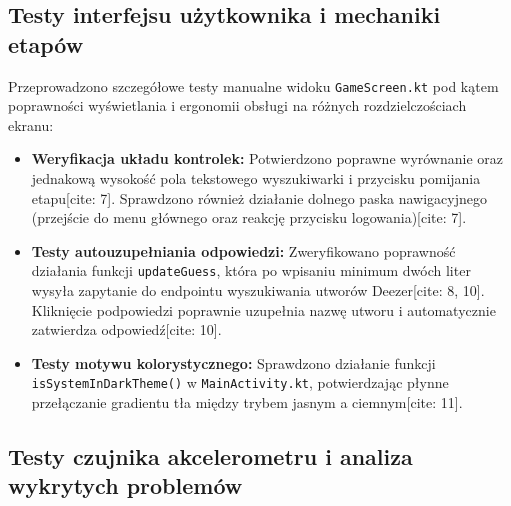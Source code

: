 \subsection{Testy interfejsu użytkownika i mechaniki etapów}

\hspace{0.60cm}Przeprowadzono szczegółowe testy manualne widoku \texttt{GameScreen.kt} pod kątem poprawności wyświetlania i ergonomii obsługi na różnych rozdzielczościach ekranu:
\begin{itemize}
    \item \textbf{Weryfikacja układu kontrolek:} Potwierdzono poprawne wyrównanie oraz jednakową wysokość pola tekstowego wyszukiwarki i przycisku pomijania etapu[cite: 7]. Sprawdzono również działanie dolnego paska nawigacyjnego (przejście do menu głównego oraz reakcję przycisku logowania)[cite: 7].
    \item \textbf{Testy autouzupełniania odpowiedzi:} Zweryfikowano poprawność działania funkcji \texttt{updateGuess}, która po wpisaniu minimum dwóch liter wysyła zapytanie do endpointu wyszukiwania utworów Deezer[cite: 8, 10]. Kliknięcie podpowiedzi poprawnie uzupełnia nazwę utworu i automatycznie zatwierdza odpowiedź[cite: 10].
    \item \textbf{Testy motywu kolorystycznego:} Sprawdzono działanie funkcji \texttt{isSystemInDarkTheme()} w \texttt{MainActivity.kt}, potwierdzając płynne przełączanie gradientu tła między trybem jasnym a ciemnym[cite: 11].
\end{itemize}

\subsection{Testy czujnika akcelerometru i analiza wykrytych problemów}

